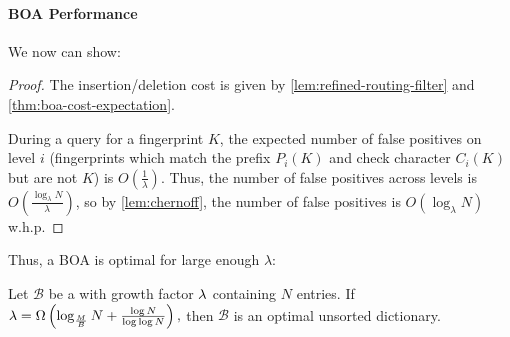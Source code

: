 \paragraph{BOA Performance}
We now can show:

\boacost*

\begin{proof}
	The insertion/deletion cost is given by \cref{lem:refined-routing-filter}
	and \cref{thm:boa-cost-expectation}.

	During a query for a fingerprint $K$, the expected number of false positives 
	on level $i$ (fingerprints which match the prefix $P_i(K)$ and check
	character $C_i(K)$ but are not $K$) is $O\left(\frac{1}{\lambda}\right)$.
	Thus, the number of false positives across levels is
	$O\left(\frac{\log_\lambda N}{\lambda}\right)$, so by \cref{lem:chernoff},
	the number of false positives is $O\left(\log_\lambda N\right)$ w.h.p.
\end{proof}

Thus, a BOA is optimal for large enough $\lambda$:

\begin{corollary}
	Let $\mathcal{B}$ be a \boa{} with growth factor $\lambda$ containing $N$
	entries. If $\lambda = \Omega\left(\log_\frac{M}{B}{N} +
	\frac{\log{N}}{\log\log{N}}\right),$ then $\mathcal{B}$ is an optimal
	unsorted dictionary.
\end{corollary}
